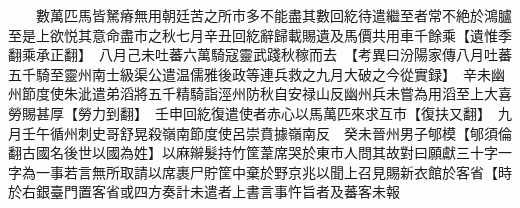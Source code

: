 　　數萬匹馬皆駑瘠無用朝廷苦之所市多不能盡其數回紇待遣繼至者常不絶於鴻臚至是上欲悦其意命盡市之秋七月辛丑回紇辭歸載賜遺及馬價共用車千餘乘【遺惟季翻乘承正翻】　八月己未吐蕃六萬騎寇靈武踐秋稼而去　【考異曰汾陽家傳八月吐蕃五千騎至靈州南士級渠公遣温儒雅後政等連兵救之九月大破之今從實録】　辛未幽州節度使朱泚遣弟滔將五千精騎詣涇州防秋自安禄山反幽州兵未嘗為用滔至上大喜勞賜甚厚【勞力到翻】　壬申回紇復遣使者赤心以馬萬匹來求互市【復扶又翻】　九月壬午循州刺史哥舒晃殺嶺南節度使呂崇賁據嶺南反　癸未晉州男子郇模【郇須倫翻古國名後世以國為姓】以麻辮髮持竹筐葦席哭於東市人問其故對曰願獻三十字一字為一事若言無所取請以席裹尸貯筐中棄於野京兆以聞上召見賜新衣館於客省【時於右銀臺門置客省或四方奏計未遣者上書言事忤旨者及蕃客未報